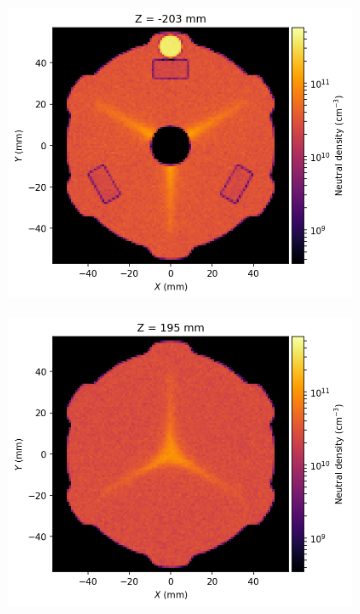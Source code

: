 \documentclass[a4paper,twoside,12pt]{article}
\begin{document}
\begin{figure}[t]
    \centering
    \begin{subfigure}{0.5\textwidth}
        \centering
        \includegraphics[width=\linewidth]{images/stationary_injection_end.png}
    \end{subfigure}%
    \begin{subfigure}{0.5\textwidth}
        \centering
        \includegraphics[width=\linewidth]{images/stationary_extraction_end.png}
    \end{subfigure}

\end{figure}
\end{document}
